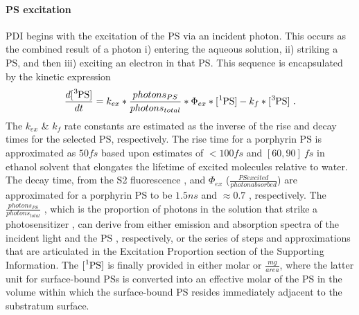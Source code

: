 \paragraph{PS excitation}
PDI begins with the excitation of the PS via an incident photon. This occurs as the combined result of a photon i) entering the aqueous solution, ii) striking a PS, and then iii) exciting an electron in that PS. This sequence is encapsulated by the kinetic expression
\begin{equation} \label{ps_excitation_kinetics}
    \frac{d[\ce{^3PS}]}{dt} =  k_{ex}*\frac{photons_{PS}}{photons_{total}}*\Phi_{ex}*[\ce{^1PS}] - k_{f}*[\ce{^3PS}]~. 
\end{equation}
The $k_{ex}$ \& $k_{f}$ rate constants are estimated as the inverse of the rise and decay times for the selected PS, respectively. The rise time for a porphyrin PS is approximated as $50 fs$ based upon estimates of $<100 fs$ \cite{Andersson1999PhotoinducedState} and $[60,90]~ fs$ in ethanol solvent \cite{Gurzadyan1998Time-resolvedZn-tetraphenylporphyrin} that elongates the lifetime of excited molecules relative to water. The decay time, from the S2 fluorescence \cite{Akimoto1999UltrafastPorphyrins}, and $\Phi_{ex}$ ($\frac{PS excited}{photon absorbed}$) are approximated for a porphyrin PS to be $1.5 ns$ and $\approx 0.7$ \cite{Krasnovsky2012PhotochemicalEnvironment}, respectively. The $\frac{photons_{PS}}{photons_{total}}$ \cite{Brasel2020AnAgalactiae}, which is the proportion of photons in the solution that strike a photosensitizer \cite{Santos2020ApplicationAureus}, can derive from either emission and absorption spectra of the incident light and the PS \cite{Gerola2012ChemicalPhotobleaching}, respectively, or the series of steps and approximations that are articulated in the Excitation Proportion section of the Supporting Information. The $[\ce{^1PS}]$ is finally provided in either molar or $\frac{mg}{area}$, where the latter unit for surface-bound PSs is converted into an effective molar of the PS in the volume within which the surface-bound PS resides immediately adjacent to the substratum surface. 

